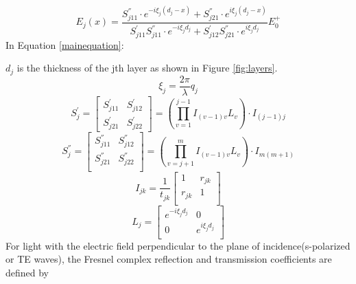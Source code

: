 \documentclass{article}
\begin{document}
\begin{equation}
{{E}_{j}}(x)=\frac{S_{j11}^{''}\cdot {{e}^{-i{{\xi
}_{j}}({{d}_{j}}-x)}}+S_{j21}^{''}\cdot {{e}^{i{{\xi }_{j}}({{d}_{j}}-x)}}}{S_{j11}^{'}S_{j11}^{''}\cdot {{e}^{-i{{\xi }_{j}}{{d}_{j}}}}+S_{j12}^{'}S_{j21}^{''}\cdot {{e}^{i{{\xi }_{j}}{{d}_{j}}}}}E_{0}^{+}
\label{mainequation} 
\end{equation}
In Equation \ref{mainequation}:

$d_j$ is the thickness of the jth layer as shown in Figure \ref{fig:layers}.
\begin{equation}
{{\xi }_{j}}=\frac{2\pi }{\lambda }{{q}_{j}}
\end{equation}
\begin{equation}
S_{j}^{'}=\left[ \begin{matrix}
   S_{j11}^{'} & S_{j12}^{'}\\
   S_{j21}^{'} & S_{j22}^{'}  
\end{matrix} \right]=\left( \prod\limits_{v=1}^{j-1}{{{I}_{(v-1)v}}{{L}_{v}}} \right)\cdot {{I}_{(j-1)j}}
\label{Sp} 
\end{equation}
\begin{equation}
S_{j}^{''}=\left[ \begin{matrix}
   S_{j11}^{''} & S_{j12}^{''}\\
   S_{j21}^{''} & S_{j22}^{''}\\
\end{matrix} \right]=\left( \prod\limits_{v=j+1}^{m}{{{I}_{(v-1)v}}{{L}_{v}}} \right)\cdot {{I}_{m(m+1)}}
\label{Spp} 
\end{equation}
\begin{equation}
{{I}_{jk}}=\frac{1}{{{t}_{jk}}}\left[ \begin{matrix}
   1 & {{r}_{jk}}  \\
   {{r}_{jk}} & 1  \\
\end{matrix} \right]
\end{equation}
\begin{equation}
{{L}_{j}}=\left[ \begin{matrix}
   {{e}^{-i{{\xi }_{j}}{{d}_{j}}}} & 0  \\
   0 & {{e}^{i{{\xi }_{j}}{{d}_{j}}}}  \\
\end{matrix} \right]
\end{equation}
For light with the electric field perpendicular to the plane of
incidence(s-polarized or TE waves), the Fresnel complex reflection and
transmission coefficients are defined by
\end{document}
